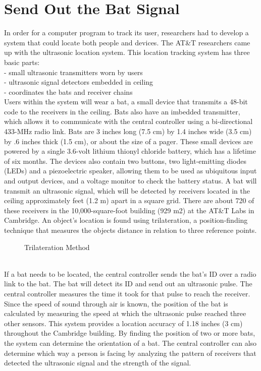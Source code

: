 \documentclass[12pt]{report}
\begin{document}
\section{Send Out the Bat Signal}
\hspace*{0.5in}In order for a computer program to track its user, researchers had to develop a system that could locate both people and devices. The AT&T researchers came up with the ultrasonic location system. This location
tracking system has three basic parts:\\
\hspace*{0.5in}{\bf Bats} - small ultrasonic transmitters worn by users\\
\hspace*{0.5in}{\bf Receivers} - ultrasonic signal detectors embedded in ceiling\\
\hspace*{0.5in}{\bf Central controller} - coordinates the bats and receiver chains\\
Users within the system will wear a bat, a small device that transmits a 48-bit code to the receivers in the ceiling. Bats also have an imbedded transmitter, which allows it to communicate with the central controller using a bi-directional 433-MHz radio link.
Bats are 3 inches long (7.5 cm) by 1.4 inches wide (3.5 cm) by .6 inches thick (1.5 cm), or about the size of a pager. These small devices are powered by a single 3.6-volt lithium thionyl chloride battery, which has a lifetime of six months. The devices also contain two buttons, two light-emitting diodes (LEDs) and a piezoelectric speaker, allowing them to be used as ubiquitous input and output devices, and a voltage monitor to check the battery status.
A bat will transmit an ultrasonic signal, which will be detected by receivers located in the ceiling approximately feet (1.2 m) apart in a square grid. There are about 720 of these receivers in the 10,000-square-foot building (929 m2) at the AT&T Labs in Cambridge. An object's location is found using trilateration, a position-finding technique that measures the objects distance in relation to three reference points.
\begin{figure}[h]
\begin{center}
\centerline{}
\caption{Trilateration Method}
\end{center}
\end{figure}
\\
\hspace*{0.5in}If a bat needs to be located, the central controller sends the bat's ID over a radio link to the bat. The bat will detect its ID and send out an ultrasonic pulse. The central controller measures the time it took for that pulse to reach the receiver. Since the speed of sound through air is known, the position of the bat is calculated by measuring the speed at which the ultrasonic pulse reached three other sensors. This system provides a location accuracy of 1.18 inches (3 cm) throughout the Cambridge building.
By finding the position of two or more bats, the system can determine the orientation of a bat. The central controller can also determine which way a person is facing by analyzing the pattern of receivers that detected the ultrasonic signal and the strength of the signal.
\end{document}
